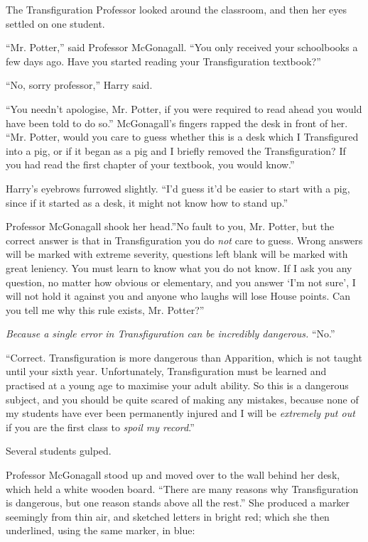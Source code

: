 The Transfiguration Professor looked around the classroom, and then her
eyes settled on one student.

``Mr. Potter,'' said Professor McGonagall. ``You only received your
schoolbooks a few days ago. Have you started reading your
Transfiguration textbook?''

``No, sorry professor,'' Harry said.

``You needn't apologise, Mr. Potter, if you were required to read ahead
you would have been told to do so.'' McGonagall's fingers rapped the
desk in front of her. ``Mr. Potter, would you care to guess whether this
is a desk which I Transfigured into a pig, or if it began as a pig and I
briefly removed the Transfiguration? If you had read the first chapter
of your textbook, you would know.''

Harry's eyebrows furrowed slightly. ``I'd guess it'd be easier to start
with a pig, since if it started as a desk, it might not know how to
stand up.''

Professor McGonagall shook her head.''No fault to you, Mr. Potter, but
the correct answer is that in Transfiguration you do \emph{not} care to
guess. Wrong answers will be marked with extreme severity, questions
left blank will be marked with great leniency. You must learn to know
what you do not know. If I ask you any question, no matter how obvious
or elementary, and you answer `I'm not sure', I will not hold it against
you and anyone who laughs will lose House points. Can you tell me why
this rule exists, Mr. Potter?''

\emph{Because a single error in Transfiguration can be incredibly
dangerous.} ``No.''

``Correct. Transfiguration is more dangerous than Apparition, which is
not taught until your sixth year. Unfortunately, Transfiguration must be
learned and practised at a young age to maximise your adult ability. So
this is a dangerous subject, and you should be quite scared of making
any mistakes, because none of my students have ever been permanently
injured and I will be \emph{extremely put out} if you are the first
class to \emph{spoil my record}.''

Several students gulped.

Professor McGonagall stood up and moved over to the wall behind her
desk, which held a white wooden board. ``There are many reasons why
Transfiguration is dangerous, but one reason stands above all the
rest.'' She produced a marker seemingly from thin air, and sketched
letters in bright red; which she then underlined, using the same marker,
in blue:

